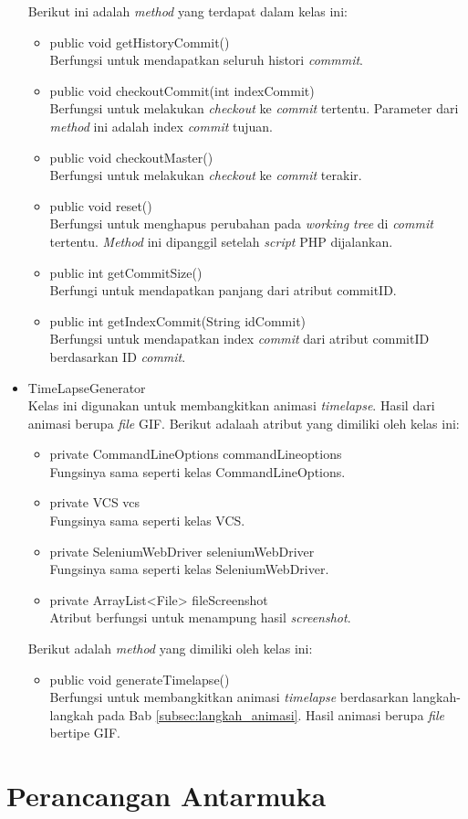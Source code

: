 \begin{itemize}
Berikut ini adalah \textit{method} yang terdapat dalam kelas ini:
\begin{itemize}
\item public void getHistoryCommit()\\
Berfungsi untuk mendapatkan seluruh histori \textit{commmit}.
\item public void checkoutCommit(int indexCommit)\\
Berfungsi untuk melakukan \textit{checkout} ke \textit{commit} tertentu. Parameter dari \textit{method} ini adalah index \textit{commit} tujuan.
\item public void checkoutMaster()\\
Berfungsi untuk melakukan \textit{checkout} ke \textit{commit} terakir.
\item public void reset()\\
Berfungsi untuk menghapus perubahan pada \textit{working tree} di \textit{commit} tertentu. \textit{Method} ini dipanggil setelah \textit{script} PHP dijalankan. 
\item public int getCommitSize()\\
Berfungi untuk mendapatkan panjang dari atribut commitID.
\item public int getIndexCommit(String idCommit)\\
Berfungsi untuk mendapatkan index \textit{commit} dari atribut commitID berdasarkan ID \textit{commit}. 
\end{itemize}


\item TimeLapseGenerator\\
Kelas ini digunakan untuk membangkitkan animasi \textit{timelapse}. Hasil dari animasi berupa \textit{file} GIF.
Berikut adalaah atribut yang dimiliki oleh kelas ini:
\begin{itemize}
\item private CommandLineOptions commandLineoptions\\
Fungsinya sama seperti kelas CommandLineOptions.
\item private VCS vcs\\
Fungsinya sama seperti kelas VCS.
\item private SeleniumWebDriver seleniumWebDriver\\
Fungsinya sama seperti kelas SeleniumWebDriver.
\item private ArrayList<File> fileScreenshot\\
Atribut berfungsi untuk menampung hasil \textit{screenshot}.
\end{itemize}

Berikut adalah \textit{method} yang dimiliki oleh kelas ini:
\begin{itemize}
\item public void generateTimelapse()\\
Berfungsi untuk membangkitkan animasi \textit{timelapse} berdasarkan langkah-langkah pada Bab \ref{subsec:langkah_animasi}. Hasil animasi berupa \textit{file} bertipe GIF.
\end{itemize}

\end{itemize}

\section{Perancangan Antarmuka}
\label{sec:perancangan_antarmuka}